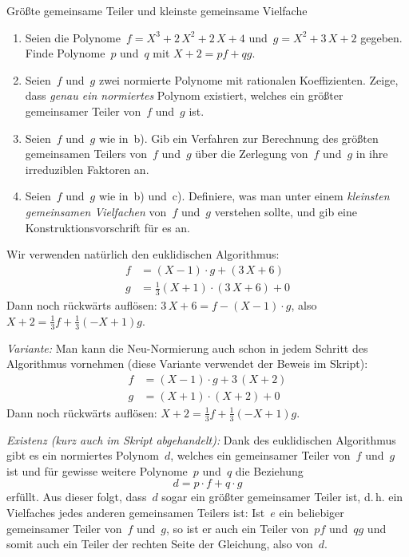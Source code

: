 \documentclass{algblatt}
\begin{document}
\vspace*{-1.5cm}
\vspace*{-0.3cm}

\begin{aufgabe}{Größte gemeinsame Teiler und kleinste gemeinsame Vielfache}
\begin{enumerate}
\item Seien die Polynome~$f = X^3 + 2\,X^2 + 2\,X + 4$
und~$g = X^2 + 3\,X + 2$ gegeben. Finde Polynome~$p$ und~$q$ mit
$X+2 = p f + q g$.
\item Seien~$f$ und~$g$ zwei normierte Polynome mit rationalen
Koeffizienten. Zeige, dass \emph{genau ein normiertes} Polynom existiert, welches ein
größter gemeinsamer Teiler von~$f$ und~$g$ ist.
\item Seien~$f$ und~$g$ wie in~b).
Gib ein Verfahren zur Berechnung des größten gemeinsamen Teilers
von~$f$ und~$g$ über die Zerlegung von~$f$ und~$g$ in ihre
irreduziblen Faktoren an.
\item Seien~$f$ und~$g$ wie in~b) und~c). Definiere, was man unter einem
\emph{kleinsten gemeinsamen Vielfachen} von~$f$ und~$g$ verstehen sollte,
und gib eine Konstruktionsvorschrift für es an.
\end{enumerate}

\begin{loesungE}
\item Wir verwenden natürlich den euklidischen Algorithmus:
\begin{align*}
  f &= (X-1) \cdot g + (3 \, X + 6) \\
  g &= \frac{1}{3} (X+1) \cdot (3\,X+6) + 0
\end{align*}
Dann noch rückwärts auflösen: $3\,X+6 = f - (X-1) \cdot g$, also $X+2 =
\frac{1}{3} f + \frac{1}{3} (-X+1) g$.

\emph{Variante:} Man kann die Neu-Normierung auch schon in jedem Schritt des
Algorithmus vornehmen (diese Variante verwendet der Beweis im Skript):
\begin{align*}
  f &= (X-1) \cdot g + 3 \, (X + 2) \\
  g &= (X+1) \cdot (X+2) + 0
\end{align*}
Dann noch rückwärts auflösen: $X + 2 = \frac{1}{3} f + \frac{1}{3} (-X+1) g$.

\item \emph{Existenz (kurz auch im Skript abgehandelt):} Dank des euklidischen
Algorithmus gibt es ein normiertes Polynom~$d$, welches ein gemeinsamer Teiler
von~$f$ und~$g$ ist und für gewisse weitere Polynome~$p$ und~$q$ die Beziehung
\[ d = p \cdot f + q \cdot g \]
erfüllt. Aus dieser folgt, dass~$d$ sogar ein größter gemeinsamer Teiler ist,
d.\,h. ein Vielfaches jedes anderen gemeinsamen Teilers ist: Ist~$e$ ein
beliebiger gemeinsamer Teiler von~$f$ und~$g$, so ist er auch ein Teiler
von~$pf$ und~$qg$ und somit auch ein Teiler der rechten Seite der Gleichung,
also von~$d$.


\end{loesungE}
\end{aufgabe}
\end{document}
